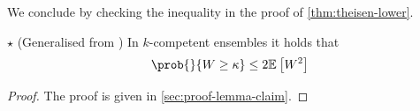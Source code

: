 \documentclass[../main.tex]{subfiles}
\begin{document}
We conclude by checking the inequality in the proof of \cref{thm:theisen-lower}.
\begin{lemma} $\star$ (Generalised from \cite{theisen_WhenAreEnsembles_2023}) In $k$-competent ensembles it holds that
\label{thm:lemma-claim}
$$
\prob{}{W \geq \kappa} \leq 2 \mathbb{E}_{}\left[ W^2 \right] 
$$
\end{lemma}
\begin{proof}
    The proof is given in \ref{sec:proof-lemma-claim}.
\end{proof}







\end{document}
